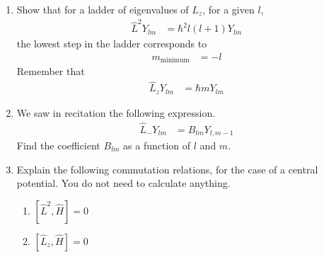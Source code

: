 \documentclass[fleqn, a4paper, 11pt, oneside]{amsart}
\theoremstyle{definition}
\theoremstyle{theorem}
\begin{document}
\begin{question}
	\begin{enumerate}
		\item
			Show that for a ladder of eigenvalues of $L_z$, for a given $l$,
			\begin{align*}
				\hat{L}^2 Y_{l m} & = \hbar^2 l (l + 1) Y_{l m}
			\end{align*}
			the lowest step in the ladder corresponds to
			\begin{align*}
				m_{\text{minimum}} & = -l
			\end{align*}
			Remember that
			\begin{align*}
				\hat{L}_z Y_{l m} & = \hbar m Y_{l m}
			\end{align*}
		\item
			We saw in recitation the following expression.
			\begin{align*}
				\hat{L}_- Y_{l m} & = B_{l m} Y_{l,m - 1}
			\end{align*}
			Find the coefficient $B_{l m}$ as a function of $l$ and $m$.
		\item
			Explain the following commutation relations, for the case of a central potential.
			You do not need to calculate anything.
			\begin{enumerate}
				\item $\left[ \hat{L}^2,\hat{H} \right] = 0$
				\item $\left[ \hat{L}_z,\hat{H} \right] = 0$
			\end{enumerate}
	\end{enumerate}
\end{question}
\end{document}
